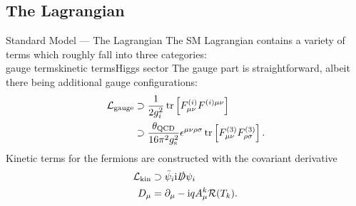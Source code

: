 \subsection{The Lagrangian}
\begin{frame}{Standard Model — The Lagrangian}
The SM Lagrangian contains a variety of terms which roughly fall into three categories:\\
\vfill
\alert{gauge terms\hfill kinetic terms\hfill Higgs sector\hfill\hfill}
\vfill
The gauge part is straightforward, albeit there being additional gauge configurations:
\begin{align*}
  \mathcal{L}_\text{gauge}&\supset\frac1{2g_i^2}\tr\left[F^{(i)}_{\mu\nu}F^{(i)\mu\nu}\right]\\
  &\supset\frac{\theta_\mathrm{QCD}}{16\pi^2g_\mathrm{s}^2}\epsilon^{\mu\nu\rho\sigma}\tr\left[F^{(3)}_{\mu\nu}F^{(3)}_{\rho\sigma}\right].
\end{align*}
Kinetic terms for the fermions are constructed with the covariant derivative
\begin{align*}
  \mathcal{L}_\mathrm{kin}&\supset\bar{\psi}_i\mathrm{i}\slashed{D}\psi_i\\
  D_\mu&=\partial_\mu-\mathrm{i} qA^k_\mu\mathcal{R}(T_k).
\end{align*}
\end{frame}

